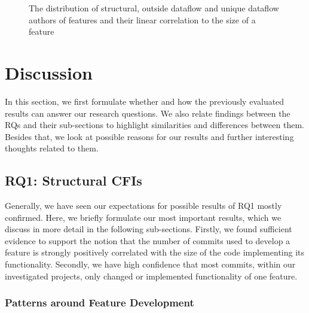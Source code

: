 \begin{figure}[htbp]
  \centering
  
  \caption{The distribution of structural, outside dataflow and unique dataflow authors of features and their linear correlation to the size of a feature}
  \label{fig:author_cfi_plot}
\end{figure}

\clearpage 

\section{Discussion}\label{sec:discussion}

In this section, we first formulate whether and how the previously evaluated results can answer our research questions.
We also relate findings between the RQs and their sub-sections to highlight similarities and differences between them.
Besides that, we look at possible reasons for our results and further interesting thoughts related to them.

\subsection*{\textbf{RQ1: Structural CFIs}}\label{sec:disc_struc_cfis}

Generally, we have seen our expectations for possible results of RQ1 mostly confirmed.
Here, we briefly formulate our most important results, which we discuss in more detail in the following sub-sections.
Firstly, we found sufficient evidence to support the notion that the number of commits used to develop a feature is strongly positively correlated with the size of the code implementing its functionality. 
Secondly, we have high confidence that most commits, within our investigated projects, only changed or implemented functionality of one feature.

\subsubsection*{Patterns around Feature Development}

